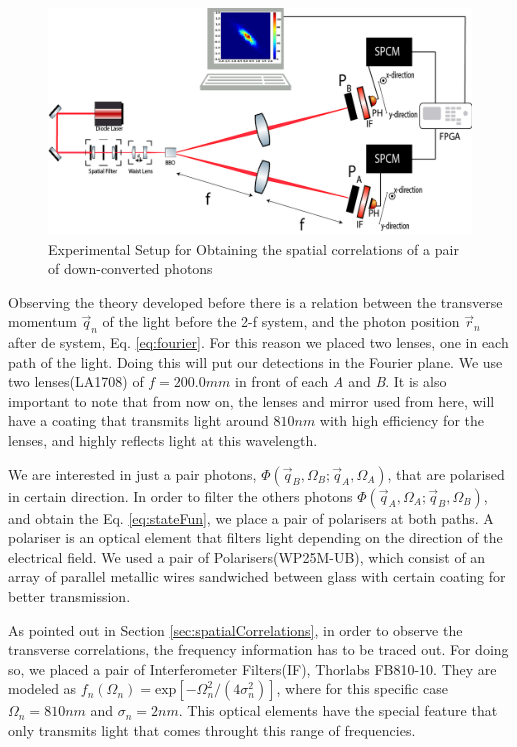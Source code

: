 \begin{figure}[h!]
\centering
\includegraphics[width=1\textwidth]{Figures/spatialCorrelationSetup.png}
\caption{Experimental Setup for Obtaining the spatial correlations of a pair of down-converted photons} 
\label{fig:spatialSetup}
\end{figure}

Observing the theory developed before there is a relation between the transverse momentum $\vec{q}_n$ of the light before the 2-f system, and the photon 
position $\vec{r}_n$ after de system, Eq. \ref{eq:fourier}. For this reason we placed two lenses, one in each path of the light.
Doing this will put our detections in the Fourier plane. We use two lenses(LA1708) of $f=200.0mm$ in front 
of each \textit{A} and \textit{B}. It is also important to note that from now on, the lenses and mirror used from here, will have a coating that
transmits light around $810nm$ with high efficiency for the lenses, and highly reflects light at this wavelength. 




We are interested in just a pair photons, $\Phi(\vec{q}_B,\Omega_B;\vec{q}_A,\Omega_A)$, that are polarised in certain direction. In order to filter the others
photons $\Phi(\vec{q}_A,\Omega_A;\vec{q}_B,\Omega_B)$, and obtain the Eq. \ref{eq:stateFun}, we place a pair of polarisers at both paths. A polariser is an optical element that filters light
depending on the direction of the electrical field. We used a pair of Polarisers(WP25M-UB), which consist of an array of parallel metallic
wires sandwiched between glass with certain coating for better transmission.





As pointed out in Section \ref{sec:spatialCorrelations}, in order to observe the transverse
correlations, the frequency information has to be traced out. For doing so, we placed a 
pair of Interferometer Filters(IF), Thorlabs FB810-10. They are modeled as $f_n (\Omega_n)=\text{exp}[-\Omega_n^2/(
4\sigma_n^2)]$, where for this specific case $\Omega_n=810nm$ and $\sigma_n=2nm$. This optical elements 
have the special feature that only transmits light that comes throught this range of frequencies. 

